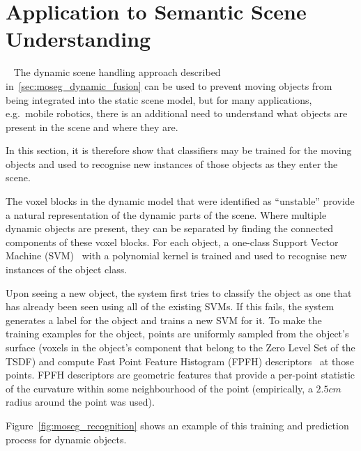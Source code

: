 \section{Application to Semantic Scene Understanding}
~\label{sec:moseg_semantic}
The dynamic scene handling approach described in~\ref{sec:moseg_dynamic_fusion}
can be used to prevent moving objects from being integrated into the static
scene model, but for many applications, e.g.\ mobile robotics, there is an
additional need to understand what objects are present in the scene and where
they are.

In this section, it is therefore show that classifiers may be trained for the
moving objects and used to recognise new instances of those objects as they
enter the scene.

The voxel blocks in the dynamic model that were identified as ``unstable''
provide a natural representation of the dynamic parts of the scene. Where
multiple dynamic objects are present, they can be separated by finding the
connected components of these voxel blocks. For each object, a one-class Support
Vector Machine (SVM)~\cite{PEGASOS} with a polynomial kernel is trained and used 
to recognise new instances of the object class.

Upon seeing a new object, the system first tries to classify the object as one
that has already been seen using all of the existing SVMs. If this fails, the
system generates a label for the object and trains a new SVM for it. To make the
training examples for the object, points are uniformly sampled from the object's
surface (voxels in the object's component that belong to the Zero Level Set of the 
TSDF) and compute Fast Point Feature Histogram (FPFH) descriptors~\cite{Rusu2009} 
at those points. FPFH descriptors are geometric features that provide a
per-point statistic of the curvature within some neighbourhood of the point
(empirically, a \(2.5cm\) radius around the point was used).

Figure~\ref{fig:moseg_recognition} shows an example of this training and
prediction process for dynamic objects.

